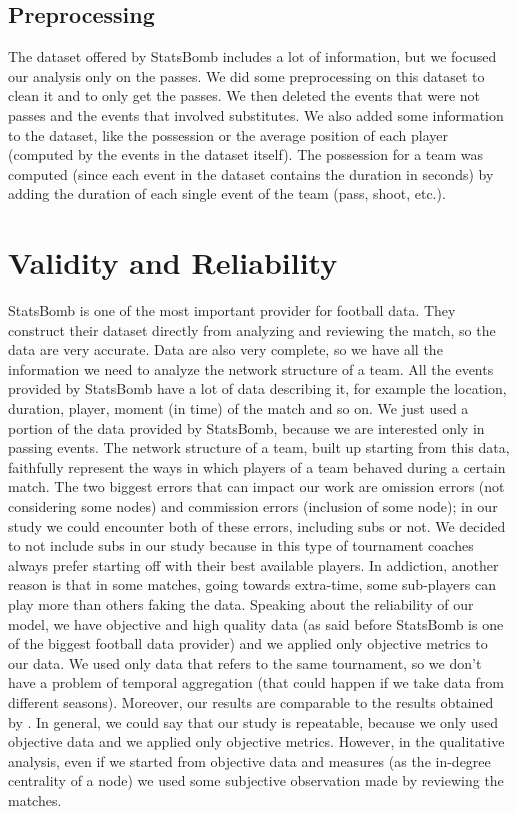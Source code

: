 \documentclass[12pt, a4paper]{article}
\begin{document}
\subsection{Preprocessing}
The dataset offered by StatsBomb includes a lot of information, but we focused our analysis only on the passes. We did some preprocessing on this dataset to clean it and to only get the passes. We then deleted the events that were not passes and the events that involved substitutes. We also added some information to the dataset, like the possession or the average position of each player (computed by the events in the dataset itself). The possession for a team was computed (since each event in the dataset contains the duration in seconds) by adding the duration of each single event of the team (pass, shoot, etc.).
 

\section{Validity and Reliability}
\label{validity-and-reliability}
StatsBomb is one of the most important provider for football data. They construct their dataset directly from analyzing and reviewing the match, so the data are very accurate. Data are also very complete, so we have all the information we need to analyze the network structure of a team. All the events provided by StatsBomb have a lot of data describing it, for example the location, duration,  player, moment (in time) of the match and so on. We just used a portion of the data provided by StatsBomb, because we are interested only in passing events. The network structure of a team, built up starting from this data, faithfully represent the ways in which players of a team behaved during a certain match. The two biggest errors that can impact our work are omission errors (not considering some nodes) and commission errors (inclusion of some node); in our study we could encounter both of these errors, including subs or not. We decided to not include subs in our study because in this type of tournament coaches always prefer starting off with their best available players. In addiction, another reason is that in some matches, going towards extra-time, some sub-players can play more than others faking the data. Speaking about the reliability of our model, we have objective and high quality data (as said before StatsBomb is one of the biggest football data provider) and we applied only objective metrics to our data. We used only data that refers to the same tournament, so we don't have a problem of temporal aggregation (that could happen if we take data from different seasons). Moreover, our results are comparable to the results obtained by \cite{GRUND}. In general, we could say that our study is repeatable, because we only used  objective data and we applied only objective metrics. However, in the qualitative analysis, even if we started from objective data and measures (as the in-degree centrality of a node) we used some subjective observation made by reviewing the matches.
\end{document}
